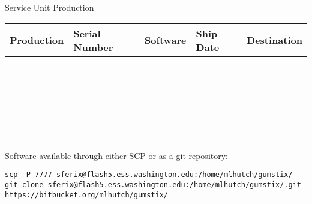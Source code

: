 \documentclass[12pt, letterpaper, onecolumn, oneside]{article}
\begin{document}
\begin{centering}
\Large{Service Unit Production}

\end{centering}

\begin{table}[h!]
\begin{center}
\begin{tabular}{|p{1.2in}|p{1.3in}|p{1.2in}|p{1.2in}|p{1.3in}|}

\hline
{\bf Production} &	{\bf Serial Number} &	{\bf Software} & {\bf Ship Date} & {\bf Destination}\\
\hline
\rule{0pt}{3ex}
	&	&	& 	& \\ \hline
\rule{0pt}{3ex}
	&	&	& 	& \\ \hline
\rule{0pt}{3ex}
	&	&	& 	& \\ \hline
\rule{0pt}{3ex}
	&	&	& 	& \\ \hline
	\rule{0pt}{3ex}
	&	&	& 	& \\ \hline
\rule{0pt}{3ex}
	&	&	& 	& \\ \hline
\rule{0pt}{3ex}
	&	&	& 	& \\ \hline
\rule{0pt}{3ex}
	&	&	& 	& \\ \hline
	\rule{0pt}{3ex}
	&	&	& 	& \\ \hline
\rule{0pt}{3ex}
	&	&	& 	& \\ \hline
\rule{0pt}{3ex}
	&	&	& 	& \\ \hline
\rule{0pt}{3ex}
	&	&	& 	& \\ \hline
	\rule{0pt}{3ex}
	&	&	& 	& \\ \hline
\rule{0pt}{3ex}
	&	&	& 	& \\ \hline
\rule{0pt}{3ex}
	&	&	& 	& \\ \hline
\rule{0pt}{3ex}
	&	&	& 	& \\ \hline
	\rule{0pt}{3ex}
	&	&	& 	& \\ \hline
\rule{0pt}{3ex}
	&	&	& 	& \\ \hline
\rule{0pt}{3ex}
	&	&	& 	& \\ \hline
\rule{0pt}{3ex}
	&	&	& 	& \\ \hline
	\rule{0pt}{3ex}
	&	&	& 	& \\ \hline
\rule{0pt}{3ex}
	&	&	& 	& \\ \hline
\rule{0pt}{3ex}
	&	&	& 	& \\ \hline
\end{tabular}
\end{center}
\label{label}
\end{table}

Software available through either SCP or as a git repository:
\begin{verbatim}
scp -P 7777 sferix@flash5.ess.washington.edu:/home/mlhutch/gumstix/
git clone sferix@flash5.ess.washington.edu:/home/mlhutch/gumstix/.git
https://bitbucket.org/mlhutch/gumstix/
\end{verbatim}

%
%
\end{document}
